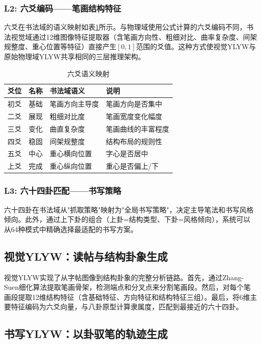 \subsubsection{L2: 六爻编码——笔画结构特征}

六爻在书法域的语义映射如表\ref{tab:yao_mapping}所示。与物理域使用公式计算的六爻编码不同，书法视觉域通过12维图像特征提取器（含笔画方向性、粗细对比、曲率复杂度、间架规整度、重心位置等特征）直接产生$[0,1]$范围的爻值。这种方式使视觉YLYW与原始物理域YLYW共享相同的三层推理架构。

\begin{table}[htbp]
\centering
\caption{六爻语义映射}
\label{tab:yao_mapping}
\begin{tabular}{ccll}
\toprule
爻位 & 名称 & 书法域语义 & 说明 \\
\midrule
初爻 & 基础 & 笔画方向主导度 & 笔画方向是否集中 \\
二爻 & 展现 & 粗细对比度 & 笔画宽度变化幅度 \\
三爻 & 变化 & 曲直复杂度 & 笔画曲线的丰富程度 \\
四爻 & 稳固 & 间架规整度 & 结构布局的规则性 \\
五爻 & 中心 & 重心横向位置 & 字心是否居中 \\
上爻 & 完成 & 重心纵向位置 & 重心是否偏上/下 \\
\bottomrule
\end{tabular}
\end{table}

\subsubsection{L3: 六十四卦匹配——书写策略}

六十四卦在书法域从"抓取策略"映射为"全局书写策略"，决定主导笔法和书写风格倾向。此外，通过上下卦的组合（上卦=结构类型、下卦=风格倾向），系统可以从64种模式中精确选择最适配的书写方案。

\subsection{视觉YLYW：读帖与结构卦象生成}

视觉YLYW实现了从字帖图像到结构卦象的完整分析链路。首先，通过Zhang-Suen细化算法提取笔画骨架，检测端点和分叉点来分割笔画段。然后，对每个笔画段提取12维结构特征（含基础特征、方向特征和结构特征三组）。最后，将6维主要特征编码为六爻向量，与八卦原型计算隶属度，匹配到最接近的六十四卦。

\subsection{书写YLYW：以卦驭笔的轨迹生成}

